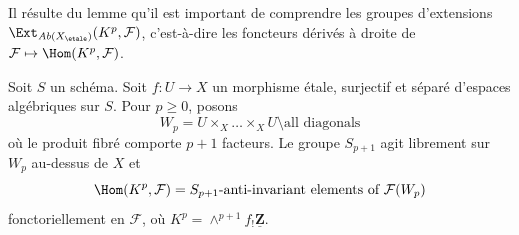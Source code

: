 \noindent
Il résulte du lemme qu'il est important de comprendre
les groupes d'extensions $\Ext_{\textit{Ab}(X_\etale)}(K^p, \mathcal{F})$,
c'est-à-dire les foncteurs dérivés à droite de
$\mathcal{F} \mapsto \Hom(K^p, \mathcal{F})$.

\begin{lemma}
\label{lemma-compute}
Soit $S$ un schéma. Soit $f : U \to X$ un morphisme étale, surjectif et séparé
d'espaces algébriques sur $S$. Pour $p \geq 0$, posons
$$
W_p = U \times_X \ldots \times_X U \setminus \text{all diagonals}
$$
où le produit fibré comporte $p + 1$ facteurs.
Le groupe $S_{p + 1}$ agit librement sur $W_p$ au-dessus de $X$ et
$$
\Hom(K^p, \mathcal{F}) = S_{p + 1}\text{-anti-invariant elements of }
\mathcal{F}(W_p)
$$
fonctoriellement en $\mathcal{F}$, où
$K^p = \wedge^{p + 1}f_!\underline{\mathbf{Z}}$.
\end{lemma}

